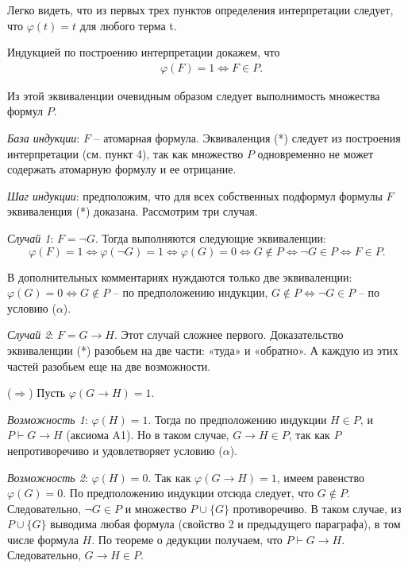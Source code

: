 \documentclass[a4paper]{article}
\begin{document}
Легко видеть, что из первых трех пунктов определения интерпретации следует, что $\varphi(t) = t$ для любого терма t.

Индукцией по построению интерпретации докажем, что
\begin{align}
	& \varphi (F) = 1 \Leftrightarrow F \in P. \tag{*}
\end{align}


Из этой эквиваленции очевидным образом следует выполнимость множества формул $P$.

\textit{База индукции}: $F$ -- атомарная формула. Эквиваленция (*) следует из построения интерпретации (см. пункт 4), так как множество $P$ одновременно не может содержать атомарную формулу и ее отрицание.

\textit{Шаг индукции}: предположим, что для всех собственных подформул формулы $F$ эквиваленция (*) доказана. Рассмотрим три случая.

\textit{Случай 1}: $F = \neg G$. Тогда выполняются следующие эквиваленции:
$$
\varphi(F) = 1 \Leftrightarrow \varphi(\neg G) = 1 \Leftrightarrow \varphi(G) = 0 \Leftrightarrow G \notin P \Leftrightarrow \neg G \in P \Leftrightarrow F \in P.
$$

В дополнительных комментариях нуждаются только две эквиваленции: $\varphi(G) = 0 \Leftrightarrow G \notin P$ – по предположению индукции, $G \notin P \Leftrightarrow \neg G \in P$ – по условию ($\alpha$).

\textit{Случай 2}: $F = G \rightarrow H$. Этот случай сложнее первого. Доказательство эквиваленции (*) разобьем на две части: «туда» и «обратно». А каждую из этих частей разобьем еще на две возможности.

($\Rightarrow$) Пусть $\varphi (G \rightarrow H) = 1$.

\textit{Возможность 1}: $\varphi(H) = 1$. Тогда по предположению индукции $H \in P$, и $P \vdash G \rightarrow H$ (аксиома A1). Но в таком случае, $G \rightarrow H \in P$, так как $P$ непротиворечиво и удовлетворяет условию ($\alpha$).

\textit{Возможность 2}: $\varphi(H) = 0$. Так как $\varphi(G \rightarrow H) = 1$, имеем равенство $\varphi (G) = 0$. По предположению индукции отсюда следует, что $G \notin P$. Следовательно, $\neg G \in P$ и множество $P \cup \{G\}$ противоречиво. В таком случае, из $P \cup \{G\}$ выводима любая формула (свойство 2 и предыдущего параграфа), в том числе формула $H$. По теореме о дедукции получаем, что $P \vdash G \rightarrow H$. Следовательно, $G \rightarrow H \in P$.
\end{document}
